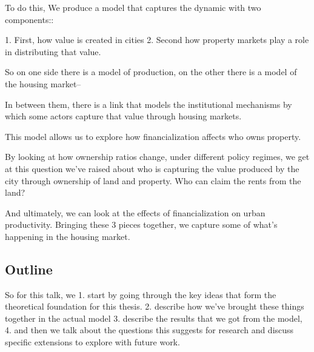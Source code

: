 To do this,  We produce a model that captures the dynamic with two components::

 1. First, how value is created in cities %
 2. Second how property markets play a role in distributing that value. %

So on one side there is a model of production, on the other there is a model of the housing market-- 

In between them, there is a link that models the institutional mechanisms by which some actors capture that value through housing markets.


This model allows us to explore  how financialization affects %
who owns property.

By looking at how ownership ratios change, under different policy regimes, 
we get at this question we've raised about who is capturing the value produced by the city through ownership of land and property.  Who can claim the rents from the land?

And ultimately, we can look at the effects of financialization on urban productivity.  
Bringing these 3 pieces together, we capture  some of what's happening in the housing market.



\subsection{Outline}

So for this talk, we  
1. start by going through the key ideas that form the theoretical foundation for this thesis. 
 2. describe how we've brought these things together in the actual model %
3. describe the results that we got from the model,
4. and then we talk about the questions this suggests for research and discuss specific extensions to explore with future work. 

